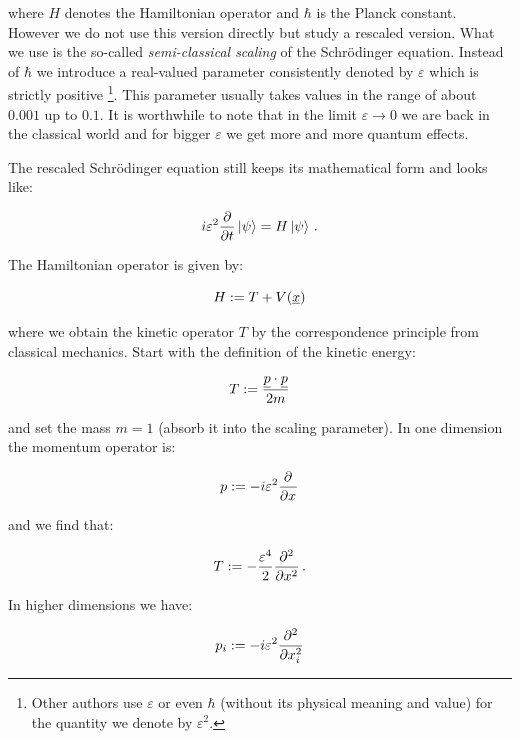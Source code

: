 where $H$ denotes the Hamiltonian operator and $\hbar$ is the Planck constant.
However we do not use this version directly but study a rescaled version.
What we use is the so-called \emph{semi-classical scaling} of the Schrödinger
equation. Instead of $\hbar$ we introduce a real-valued parameter consistently
denoted by $\varepsilon$ which is strictly positive
\footnote{Other authors use $\varepsilon$ or even $\hbar$ (without its physical
meaning and value) for the quantity we denote by $\varepsilon^2$.}.
This parameter usually takes values in the range of about $0.001$ up to $0.1$.
It is worthwhile to note that in the limit $\varepsilon \rightarrow 0$ we
are back in the classical world and for bigger $\varepsilon$ we get more and more
quantum effects.

The rescaled Schrödinger equation still keeps its mathematical form and looks
like:

\begin{equation} \label{eq:basics_tdse_semi}
  i \varepsilon^2 \frac{\partial}{\partial t} \Ket{\psi} = H \Ket{\psi} \,.
\end{equation}

The Hamiltonian operator is given by:

\begin{equation}
  H \assign T + V(\vec{x})
\end{equation}

where we obtain the kinetic operator $T$ by the correspondence principle from
classical mechanics. Start with the definition of the kinetic energy:

\begin{equation*}
  T \assign \frac{\vec{p}\cdot\vec{p}}{2m}
\end{equation*}

and set the mass $m=1$ (absorb it into the scaling parameter). In one dimension
the momentum operator is:

\begin{equation*}
  p \assign -i \varepsilon^2 \pdiff{}{x}
\end{equation*}

and we find that:

\begin{equation*}
  T \assign - \frac{\varepsilon^4}{2} \pdiff[2]{}{x} \,.
\end{equation*}

In higher dimensions we have:

\begin{equation*}
  p_{i} \assign -i \varepsilon^2 \pdiff[2]{}{x_i}
\end{equation*}

